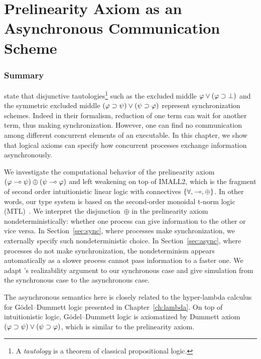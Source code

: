 \chapter{Prelinearity Axiom as an Asynchronous Communication Scheme}
\label{ch:pole}

\subsection{Summary}
\citet{danos-krivine} state that
disjunctive tautologies\footnote{A \textit{tautology}
is a theorem of classical propositional logic.}
such as the excluded middle $\varphi\vee(\varphi\supset\bot)$
and the symmetric excluded middle $(\varphi\supset\psi)\vee(\psi\supset\varphi)$
represent synchronization schemes.
Indeed in their formalism, reduction of one term can wait
for another term, thus making synchronization.
However,
one can find no communication among different
concurrent elements of an executable.
In this chapter, we show that logical axioms can specify how
concurrent processes exchange information asynchronously.

We investigate the computational behavior of the prelinearity axiom
$(\varphi\multimap\psi)\oplus(\psi\multimap\varphi)$ and left weakening
on top of IMALL2, which is the fragment of second order
intuitionistic linear logic with connectives $\{\forall, \multimap,
\oplus\}$.  In other words, our type system is based on the second-order
monoidal t-norm logic
(MTL)~\citep{Esteva2001271}.
We interpret the disjunction~$\oplus$ in the prelinearity axiom
nondeterministically: whether
one process can give information to the other or
vice versa.
In Section~\ref{sec:sync}, where processes make synchronization,
we externally specify such nondeterministic choice.
In Section~\ref{sec:async}, where processes do not make synchronization,
the nondeterminism appears automatically as a slower process cannot pass
information to a faster one.
We adapt \citet{danos-krivine}'s realizability argument to our
synchronous case and give simulation from the
synchronous case to the asynchronous case.

The asynchronous semantics here is closely related to
the hyper-lambda calculus for G\"odel--Dummett logic presented in
Chapter~\ref{ch:lambda}.
On top of intuitionistic logic,
G\"odel--Dummett logic is axiomatized by Dummett axiom
$(\varphi\supset\psi)\lor(\psi\supset\varphi)$, which is similar to the prelinearity axiom.

